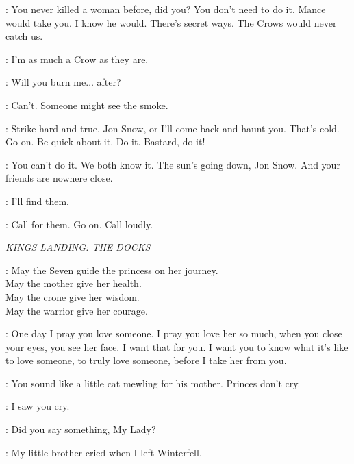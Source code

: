 
\YGRITTE: You never killed a woman before, did you? You don't need to do it. Mance would take you. I know he would. There's secret ways. The Crows would never catch us. 

\JON: I'm as much a Crow as they are. 

\YGRITTE: Will you burn me$\ldots$ after? 

\JON: Can't. Someone might see the smoke. 

\YGRITTE: Strike hard and true, Jon Snow, or I'll come back and haunt you. That's cold. Go on. Be quick about it. Do it. Bastard, do it! 


\YGRITTE: You can't do it. We both know it. The sun's going down, Jon Snow. And your friends are nowhere close. 

\JON: I'll find them. 

\YGRITTE: Call for them. Go on. Call loudly. 


\scene

\textit{KINGS LANDING: THE DOCKS} 


\HIGHSEPTON: May the Seven guide the princess on her journey.\\
May the mother give her health.\\
May the crone give her wisdom.\\
May the warrior give her courage.

\CERSEI:  One day I pray you love someone. I pray you love her so much, when you close your eyes, you see her face. I want that for you. I want you to know what it's like to love someone, to truly love someone, before I take her from you.


\JOFFREY:  You sound like a little cat mewling for his mother. Princes don't cry. 

\SANSA: I saw you cry. 

\JOFFREY: Did you say something, My Lady? 

\SANSA: My little brother cried when I left Winterfell. 

